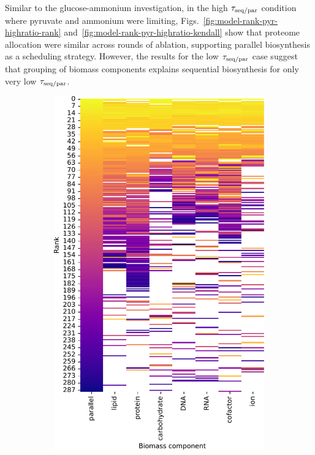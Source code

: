 Similar to the glucose-ammonium investigation, in the high $\tau_{\mathrm{seq}/\mathrm{par}}$ condition where pyruvate and ammonium were limiting, Figs.\ \ref{fig:model-rank-pyr-highratio-rank} and~\ref{fig:model-rank-pyr-highratio-kendall} show that proteome allocation were similar across rounds of ablation, supporting parallel biosynthesis as a scheduling strategy.
However, the results for the low $\tau_{\mathrm{seq}/\mathrm{par}}$ case suggest that grouping of biomass components explains sequential biosynthesis for only very low $\tau_{\mathrm{seq}/\mathrm{par}}$.

\begin{figure}[htbp!]
  \centering
  \begin{subfigure}[t]{0.45\textwidth}
  \centering
    \includegraphics[width=\linewidth]{CompareEnzUse_glc00p00_pyr03p73_amm00p90_1.pdf}

\end{subfigure}
\end{figure}
